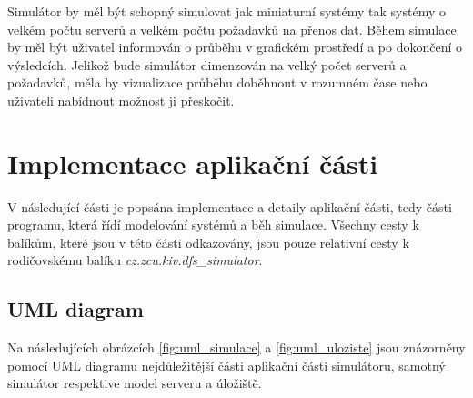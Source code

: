 \documentclass[czech,DP]{thesiskiv}
\begin{document}
Simulátor by měl být schopný simulovat jak miniaturní systémy tak systémy o velkém počtu serverů a velkém počtu požadavků na přenos dat. Během simulace by měl být uživatel informován o průběhu v grafickém prostředí a po dokončení o výsledcích. Jelikož bude simulátor dimenzován na velký počet serverů a požadavků, měla by vizualizace průběhu doběhnout v rozumném čase nebo uživateli nabídnout možnost ji přeskočit.

\chapter{Implementace aplikační části}

V následující části je popsána implementace a detaily aplikační části, tedy části programu, která řídí modelování systémů a běh simulace. Všechny cesty k balíkům, které jsou v této části odkazovány, jsou pouze relativní cesty k rodičovskému balíku \textit{cz.zcu.kiv.dfs\_simulator}.

\section{UML diagram}

Na následujících obrázcích \ref{fig:uml_simulace} a \ref{fig:uml_uloziste} jsou znázorněny pomocí UML diagramu nejdůležitější části aplikační části simulátoru, samotný simulátor respektive model serveru a úložiště.
\end{document}
